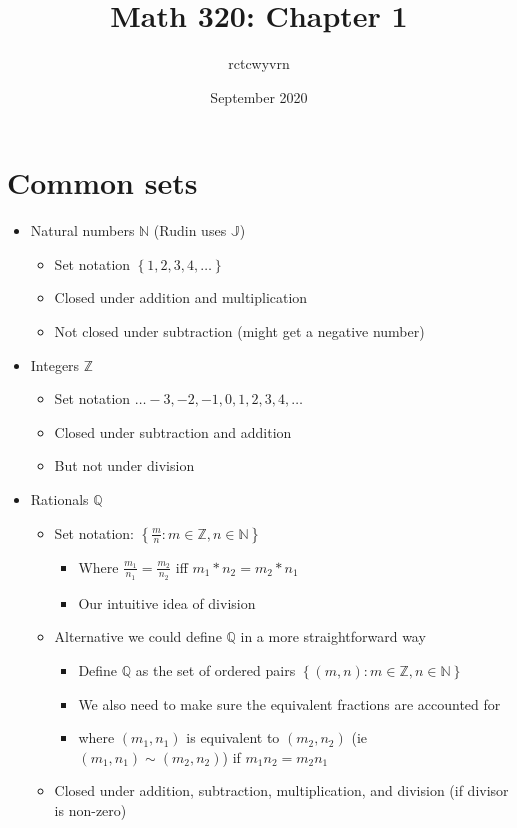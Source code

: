 \documentclass{article}
\title{Math 320: Chapter 1}
\author{rctcwyvrn}
\date{September 2020}
\newcommand{\Z}{\mathbb{Z}}
\newcommand{\Q}{\mathbb{Q}}
\newcommand{\N}{\mathbb{N}}
\begin{document}
\maketitle

\section{Common sets}
\begin{itemize}
	\item Natural numbers $\N$ (Rudin uses $\mathbb{J}$)
		\begin{itemize}
			\item Set notation $\left\{ 1, 2, 3, 4, \ldots\right\}$
			\item Closed under addition and multiplication
			\item Not closed under subtraction (might get a negative number)
		\end{itemize}
	\item Integers $\Z$
		\begin{itemize}
			\item Set notation $\ldots -3, -2, -1, 0,1,2,3,4,\ldots$
			\item Closed under subtraction and addition
			\item But not under division
		\end{itemize}
	\item Rationals $\Q$
		\begin{itemize}
			\item Set notation: $\left\{\frac{m}{n}: m\in\Z, n\in \N \right\}$
			\begin{itemize}
				\item Where $\frac{m_1}{n_1} = \frac{m_2}{n_2}$ iff $m_1*n_2 = m_2*n_1$
				\item Our intuitive idea of division
			\end{itemize}
		\item Alternative we could define $\Q$ in a more straightforward way
			\begin{itemize}
				\item Define $\Q$ as the set of ordered pairs $\left\{(m,n): m\in\Z, n\in \N  \right\}$
				\item We also need to make sure the equivalent fractions are accounted for
				\item where $(m_1,n_1)$ is equivalent to $(m_2,n_2)$ (ie $(m_1,n_1) \sim (m_2,n_2)$) if $m_1n_2 = m_2n_1$
			\end{itemize}
		\item Closed under addition, subtraction, multiplication, and division (if divisor is non-zero)

\end{itemize}
\end{itemize}
\end{document}
